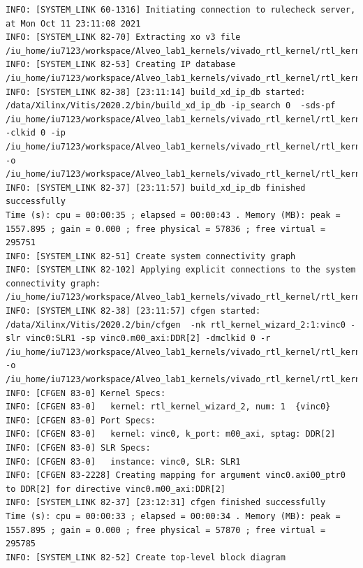 \begin{lstlisting}
INFO: [SYSTEM_LINK 60-1316] Initiating connection to rulecheck server, at Mon Oct 11 23:11:08 2021
INFO: [SYSTEM_LINK 82-70] Extracting xo v3 file /iu_home/iu7123/workspace/Alveo_lab1_kernels/vivado_rtl_kernel/rtl_kernel_wizard_2_ex/exports/rtl_kernel_wizard_2.xo
INFO: [SYSTEM_LINK 82-53] Creating IP database /iu_home/iu7123/workspace/Alveo_lab1_kernels/vivado_rtl_kernel/rtl_kernel_wizard_2_ex/exports/_x/link/sys_link/_sysl/.cdb/xd_ip_db.xml
INFO: [SYSTEM_LINK 82-38] [23:11:14] build_xd_ip_db started: /data/Xilinx/Vitis/2020.2/bin/build_xd_ip_db -ip_search 0  -sds-pf /iu_home/iu7123/workspace/Alveo_lab1_kernels/vivado_rtl_kernel/rtl_kernel_wizard_2_ex/exports/_x/link/sys_link/xilinx_u200_xdma_201830_2.hpfm -clkid 0 -ip /iu_home/iu7123/workspace/Alveo_lab1_kernels/vivado_rtl_kernel/rtl_kernel_wizard_2_ex/exports/_x/link/sys_link/iprepo/mycompany_com_kernel_rtl_kernel_wizard_2_1_0,rtl_kernel_wizard_2 -o /iu_home/iu7123/workspace/Alveo_lab1_kernels/vivado_rtl_kernel/rtl_kernel_wizard_2_ex/exports/_x/link/sys_link/_sysl/.cdb/xd_ip_db.xml
INFO: [SYSTEM_LINK 82-37] [23:11:57] build_xd_ip_db finished successfully
Time (s): cpu = 00:00:35 ; elapsed = 00:00:43 . Memory (MB): peak = 1557.895 ; gain = 0.000 ; free physical = 57836 ; free virtual = 295751
INFO: [SYSTEM_LINK 82-51] Create system connectivity graph
INFO: [SYSTEM_LINK 82-102] Applying explicit connections to the system connectivity graph: /iu_home/iu7123/workspace/Alveo_lab1_kernels/vivado_rtl_kernel/rtl_kernel_wizard_2_ex/exports/_x/link/sys_link/cfgraph/cfgen_cfgraph.xml
INFO: [SYSTEM_LINK 82-38] [23:11:57] cfgen started: /data/Xilinx/Vitis/2020.2/bin/cfgen  -nk rtl_kernel_wizard_2:1:vinc0 -slr vinc0:SLR1 -sp vinc0.m00_axi:DDR[2] -dmclkid 0 -r /iu_home/iu7123/workspace/Alveo_lab1_kernels/vivado_rtl_kernel/rtl_kernel_wizard_2_ex/exports/_x/link/sys_link/_sysl/.cdb/xd_ip_db.xml -o /iu_home/iu7123/workspace/Alveo_lab1_kernels/vivado_rtl_kernel/rtl_kernel_wizard_2_ex/exports/_x/link/sys_link/cfgraph/cfgen_cfgraph.xml
INFO: [CFGEN 83-0] Kernel Specs: 
INFO: [CFGEN 83-0]   kernel: rtl_kernel_wizard_2, num: 1  {vinc0}
INFO: [CFGEN 83-0] Port Specs: 
INFO: [CFGEN 83-0]   kernel: vinc0, k_port: m00_axi, sptag: DDR[2]
INFO: [CFGEN 83-0] SLR Specs: 
INFO: [CFGEN 83-0]   instance: vinc0, SLR: SLR1
INFO: [CFGEN 83-2228] Creating mapping for argument vinc0.axi00_ptr0 to DDR[2] for directive vinc0.m00_axi:DDR[2]
INFO: [SYSTEM_LINK 82-37] [23:12:31] cfgen finished successfully
Time (s): cpu = 00:00:33 ; elapsed = 00:00:34 . Memory (MB): peak = 1557.895 ; gain = 0.000 ; free physical = 57870 ; free virtual = 295785
INFO: [SYSTEM_LINK 82-52] Create top-level block diagram

\end{lstlisting}
